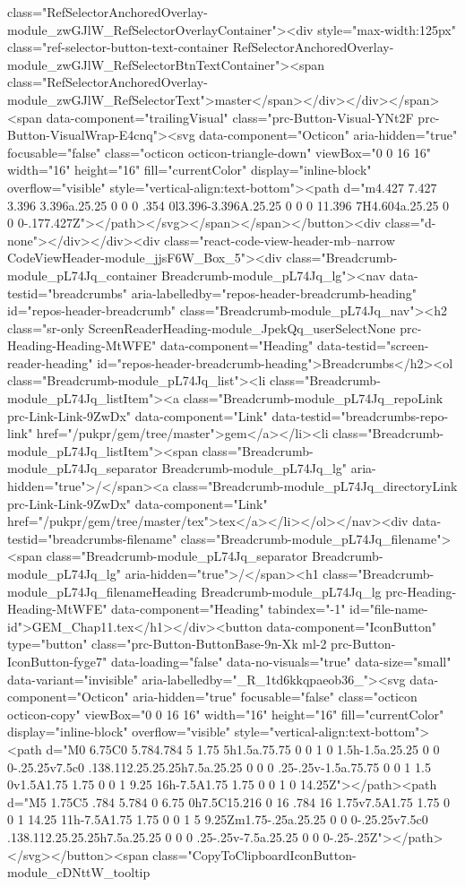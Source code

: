 class="RefSelectorAnchoredOverlay-module_zwGJlW_RefSelectorOverlayContainer"><div style="max-width:125px" class="ref-selector-button-text-container RefSelectorAnchoredOverlay-module_zwGJlW_RefSelectorBtnTextContainer"><span class="RefSelectorAnchoredOverlay-module_zwGJlW_RefSelectorText">master</span></div></div></span><span data-component="trailingVisual" class="prc-Button-Visual-YNt2F prc-Button-VisualWrap-E4cnq"><svg data-component="Octicon" aria-hidden="true" focusable="false" class="octicon octicon-triangle-down" viewBox="0 0 16 16" width="16" height="16" fill="currentColor" display="inline-block" overflow="visible" style="vertical-align:text-bottom"><path d="m4.427 7.427 3.396 3.396a.25.25 0 0 0 .354 0l3.396-3.396A.25.25 0 0 0 11.396 7H4.604a.25.25 0 0 0-.177.427Z"></path></svg></span></span></button><div class="d-none"></div></div><div class="react-code-view-header-mb--narrow CodeViewHeader-module_jjsF6W_Box_5"><div class="Breadcrumb-module_pL74Jq_container Breadcrumb-module_pL74Jq_lg"><nav data-testid="breadcrumbs" aria-labelledby="repos-header-breadcrumb-heading" id="repos-header-breadcrumb" class="Breadcrumb-module_pL74Jq_nav"><h2 class="sr-only ScreenReaderHeading-module_JpekQq_userSelectNone prc-Heading-Heading-MtWFE" data-component="Heading" data-testid="screen-reader-heading" id="repos-header-breadcrumb-heading">Breadcrumbs</h2><ol class="Breadcrumb-module_pL74Jq_list"><li class="Breadcrumb-module_pL74Jq_listItem"><a class="Breadcrumb-module_pL74Jq_repoLink prc-Link-Link-9ZwDx" data-component="Link" data-testid="breadcrumbs-repo-link" href="/pukpr/gem/tree/master">gem</a></li><li class="Breadcrumb-module_pL74Jq_listItem"><span class="Breadcrumb-module_pL74Jq_separator Breadcrumb-module_pL74Jq_lg" aria-hidden="true">/</span><a class="Breadcrumb-module_pL74Jq_directoryLink prc-Link-Link-9ZwDx" data-component="Link" href="/pukpr/gem/tree/master/tex">tex</a></li></ol></nav><div data-testid="breadcrumbs-filename" class="Breadcrumb-module_pL74Jq_filename"><span class="Breadcrumb-module_pL74Jq_separator Breadcrumb-module_pL74Jq_lg" aria-hidden="true">/</span><h1 class="Breadcrumb-module_pL74Jq_filenameHeading Breadcrumb-module_pL74Jq_lg prc-Heading-Heading-MtWFE" data-component="Heading" tabindex="-1" id="file-name-id">GEM_Chap11.tex</h1></div><button data-component="IconButton" type="button" class="prc-Button-ButtonBase-9n-Xk ml-2 prc-Button-IconButton-fyge7" data-loading="false" data-no-visuals="true" data-size="small" data-variant="invisible" aria-labelledby="_R_1td6kkqpaeob36_"><svg data-component="Octicon" aria-hidden="true" focusable="false" class="octicon octicon-copy" viewBox="0 0 16 16" width="16" height="16" fill="currentColor" display="inline-block" overflow="visible" style="vertical-align:text-bottom"><path d="M0 6.75C0 5.784.784 5 1.75 5h1.5a.75.75 0 0 1 0 1.5h-1.5a.25.25 0 0 0-.25.25v7.5c0 .138.112.25.25.25h7.5a.25.25 0 0 0 .25-.25v-1.5a.75.75 0 0 1 1.5 0v1.5A1.75 1.75 0 0 1 9.25 16h-7.5A1.75 1.75 0 0 1 0 14.25Z"></path><path d="M5 1.75C5 .784 5.784 0 6.75 0h7.5C15.216 0 16 .784 16 1.75v7.5A1.75 1.75 0 0 1 14.25 11h-7.5A1.75 1.75 0 0 1 5 9.25Zm1.75-.25a.25.25 0 0 0-.25.25v7.5c0 .138.112.25.25.25h7.5a.25.25 0 0 0 .25-.25v-7.5a.25.25 0 0 0-.25-.25Z"></path></svg></button><span class="CopyToClipboardIconButton-module_cDNttW_tooltip 